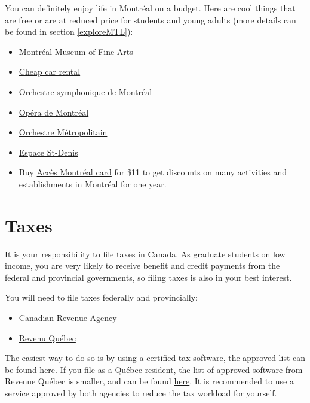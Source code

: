 You can definitely enjoy life in Montréal on a budget. Here are cool things that are free or are at reduced price for students and young adults (more details can be found in section \hyperref[exploreMTL]{\textcolor{purble}{\ref*{exploreMTL}}}):
        \begin{itemize}
        \item \href{https://www.mbam.qc.ca/en/information/discounts-and-free-offers/}{Montr\'eal Museum of Fine Arts}
            \item \href{https://www.mcgill.ca/travelservices/transport/book-vehicle}{Cheap car rental} 
            \item \href{https://www.osm.ca/en/single-tickets/}{Orchestre symphonique de Montréal }
            \item \href{https://operademontreal.com/en/young-adult-opera-tickets}{Opéra de Montréal} 
            \item \href{https://orchestremetropolitain.com/en/education-at-the-om/}{Orchestre Métropolitain}
            \item \href{https://espacestdenis.com/fr/rabais-etudiants/}{Espace St-Denis} 
            \item Buy \href{https://montreal.ca/en/articles/acces-montreal-card-exclusive-offers-and-discounts-5990}{Accès Montréal card} for \$11 to get discounts on many activities and establishments in Montréal for one year.
        \end{itemize}

\section{Taxes}  \label{tax}
It is your responsibility to file taxes in Canada. As graduate students on low income, you are very likely to receive benefit and credit payments from the federal and provincial governments, so filing taxes is also in your best interest.

You will need to file taxes federally and provincially:
\begin{itemize}
    \item \href{https://www.canada.ca/en/services/taxes/income-tax/personal-income-tax.html}{Canadian Revenue Agency} 
    \item \href{https://www.revenuquebec.ca/en/citizens/income-tax-return/}{Revenu Québec}
\end{itemize}    

The easiest way to do so is by using a certified tax software, the approved list can be found \href{https://www.canada.ca/en/services/taxes/income-tax/personal-income-tax/how-file/tax-software/find-software.html}{here}. If you file as a Québec resident, the list of approved software from Revenue Québec is smaller, and can be found \href{https://www.revenuquebec.ca/en/partners/authorized-products/authorized-software/personal-income-tax-return-individuals/}{here}. It is recommended to use a service approved by both agencies to reduce the tax workload for yourself. 

